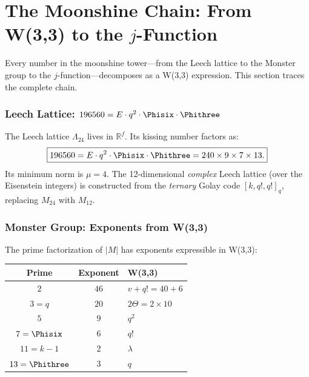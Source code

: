 \clearpage
\part{\texorpdfstring{The Moonshine Chain: From W(3,3) to the $j$-Function}{The Moonshine Chain: From W(3,3) to the j-Function}}

Every number in the moonshine tower---from the Leech lattice
to the Monster group to the $j$-function---decomposes as
a W(3,3) expression. This section traces the complete chain.

\section{\texorpdfstring{Leech Lattice: $196560 = E\cdot q^2\cdot\Phisix\cdot\Phithree$}{Leech Lattice: 196560 = E times q-squared times Phi6 times Phi3}}

The Leech lattice $\Lambda_{24}$ lives in $\mathbb{R}^f$.
Its kissing number factors as:
\begin{equation}
\boxed{196560 = E\cdot q^2\cdot\Phisix\cdot\Phithree = 240\times 9\times 7\times 13.}
\end{equation}
Its minimum norm is $\mu=4$. The 12-dimensional \emph{complex} Leech lattice
(over the Eisenstein integers) is constructed from the \emph{ternary} Golay
code $[k,q!,q!]_q$, replacing $M_{24}$ with $M_{12}$.

\section{Monster Group: Exponents from W(3,3)}

\begin{theorem}
The prime factorization of $|M|$ has exponents expressible in W(3,3):
\begin{center}
\begin{tabular}{@{}ccl@{}}
\toprule
Prime & Exponent & W(3,3) \\
\midrule
$2$ & $46$ & $v + q! = 40+6$ \\
$3=q$ & $20$ & $2\Theta = 2\times 10$ \\
$5$ & $9$ & $q^2$ \\
$7=\Phisix$ & $6$ & $q!$ \\
$11=k{-}1$ & $2$ & $\lambda$ \\
$13=\Phithree$ & $3$ & $q$ \\
\bottomrule
\end{tabular}
\end{center}
\end{theorem}

